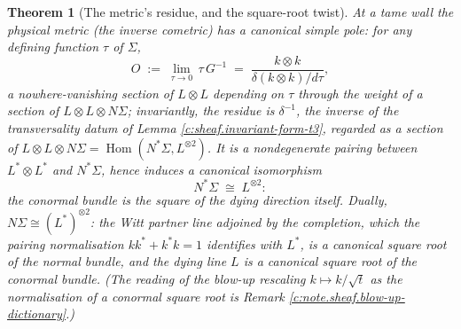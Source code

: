 \documentclass[11pt]{article}
\newtheorem{theorem}{Theorem}[section]
\theoremstyle{definition}
\theoremstyle{plain}
\providecommand{\Sig}{}\renewcommand{\Sig}{\Sigma}
\providecommand{\shL}{}\renewcommand{\shL}{L}
\begin{document}
\begin{theorem}[The metric's residue, and the square-root twist]\label{c:sheaf.metrics-residue-square-root-twist}
At a tame wall the physical metric (the inverse cometric) has a canonical simple pole: for any defining function $\tau$ of $\Sig$,
\[
O \;:=\; \lim_{\tau \to 0}\, \tau\, G^{-1} \;=\; \frac{k \otimes k}{\delta(k \otimes k)/d\tau} ,
\]
a nowhere-vanishing section of $\shL \otimes \shL$ depending on $\tau$ through the weight of a section of $\shL \otimes \shL \otimes N\Sig$; invariantly, the residue is $\delta^{-1}$, the inverse of the transversality datum of Lemma \ref{c:sheaf.invariant-form-t3}, regarded as a section of $\shL \otimes \shL \otimes N\Sig = \operatorname{Hom}(N^*\Sig, \shL^{\otimes 2})$. It is a nondegenerate pairing between $\shL^* \otimes \shL^*$ and $N^*\Sig$, hence induces a canonical isomorphism
\[
N^*\Sig \;\cong\; \shL^{\otimes 2} :
\]
the conormal bundle is the square of the dying direction itself. Dually, $N\Sig \cong (\shL^*)^{\otimes 2}$: the Witt partner line adjoined by the completion, which the pairing normalisation $kk^* + k^*k = 1$ identifies with $\shL^*$, is a canonical square root of the \emph{normal} bundle, and the dying line $\shL$ is a canonical square root of the conormal bundle. (The reading of the blow-up rescaling $k \mapsto k/\sqrt{t}$ as the normalisation of a conormal square root is Remark \ref{c:note.sheaf.blow-up-dictionary}.)
\end{theorem}
\end{document}
